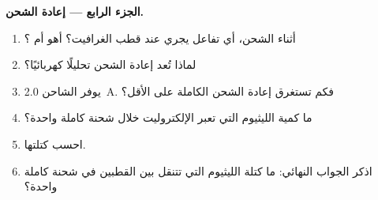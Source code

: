 \begin{problem}
\medskip
\noindent\textbf{الجزء الرابع --- إعادة الشحن.}
\begin{enumerate}[resume]
  \item أثناء الشحن، أي تفاعل يجري عند قطب
        الغرافيت؟ أهو  أم ؟
  \item لماذا تُعد إعادة الشحن تحليلًا كهربائيًا؟
  \item يوفر الشاحن \qty{2.0}{A}. فكم تستغرق إعادة الشحن الكاملة
        على الأقل؟
  \item ما كمية  الليثيوم التي تعبر الإلكتروليت خلال
        شحنة كاملة واحدة؟
  \item احسب كتلتها.
  \item اذكر الجواب النهائي: ما كتلة الليثيوم التي تتنقل بين
        القطبين في شحنة كاملة واحدة؟
\end{enumerate}
\end{problem}
